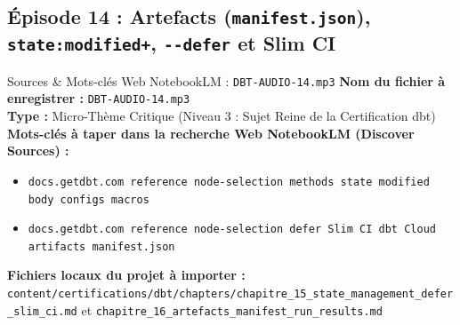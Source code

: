 \documentclass[11pt,a4paper]{article}
\newcommand{\flag}[1]{\texttt{-{}-#1}}
\begin{document}
\subsection{Épisode 14 : Artefacts (\texttt{manifest.json}), \texttt{state:modified+}, \flag{defer} et Slim CI}
\begin{sourcebox}{Sources \& Mots-clés Web NotebookLM : \texttt{DBT-AUDIO-14.mp3}}
\textbf{Nom du fichier à enregistrer :} \texttt{DBT-AUDIO-14.mp3}\\
\textbf{Type :} Micro-Thème Critique (Niveau 3 : Sujet Reine de la Certification dbt)\\
\textbf{Mots-clés à taper dans la recherche Web NotebookLM (Discover Sources) :}
\begin{itemize}[noitemsep]
    \item \texttt{docs.getdbt.com reference node-selection methods state modified body configs macros}
    \item \texttt{docs.getdbt.com reference node-selection defer Slim CI dbt Cloud artifacts manifest.json}
\end{itemize}
\textbf{Fichiers locaux du projet à importer :}
\texttt{content/certifications/dbt/chapters/chapitre_15_state_management_defer_slim_ci.md} et \texttt{chapitre_16_artefacts_manifest_run_results.md}
\end{sourcebox}
\end{document}
